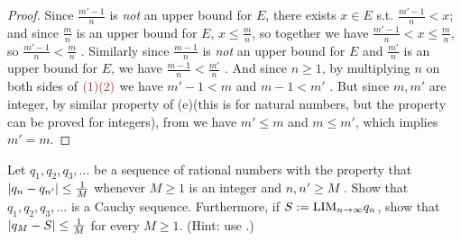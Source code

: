 \begin{proof}
Since \(\frac{m' - 1}{n}\) is \emph{not} an upper bound for \(E\), there exists \(x \in E\) s.t. \(\frac{m' - 1}{n} < x\);
and since \(\frac{m}{n}\) is an upper bound for \(E\), \(x \le \frac{m}{n}\), so together we have \(\frac{m' - 1}{n} < x \le \frac{m}{n}\), so \(\frac{m' - 1}{n} < \frac{m}{n}\) .
Similarly since \(\frac{m - 1}{n}\) is \emph{not} an upper bound for \(E\) and \(\frac{m'}{n}\) is an upper bound for \(E\), we have \(\frac{m - 1}{n} < \frac{m'}{n}\) .
And since \(n \ge 1\), by multiplying \(n\) on both sides of \(\MAROON{(1) (2)}\) we have \(m' - 1 < m\) and \(m - 1 < m'\) .
But since \(m, m'\) are integer, by similar property of (e)(this is for natural numbers, but the property can be proved for integers), from  we have \(m' \le m\) and \(m \le m'\), which implies \(m' = m\).
\end{proof}

\begin{exercise} \label{exercise 5.5.4}
Let \(q_1, q_2, q_3,...\) be a sequence of rational numbers with the property that \(\lvert q_n - q_{n'}\rvert \le \frac{1}{M}\) whenever \(M \ge 1\) is an integer and \(n, n' \ge M\) .
Show that \(q_1, q_2, q_3,...\) is a Cauchy sequence.
Furthermore, if \(S := \text{LIM}_{n \to \infty} q_n\), show that \(\lvert q_M - S\rvert \le \frac{1}{M}\) for every \(M \ge 1\).
(Hint: use .)
\end{exercise}


